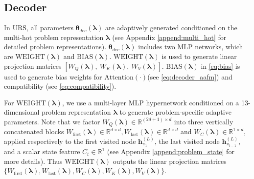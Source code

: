 \documentclass{article}
\theoremstyle{plain}
\theoremstyle{definition}
\theoremstyle{remark}
\begin{document}
\subsection{Decoder}
\label{append:decoder}
In URS, all parameters $\bm{\theta}_{dec}(\bm{\lambda})$ are adaptively generated conditioned on the multi-hot problem representation $\bm{\lambda}$ (see Appendix \ref{append:multi_hot} for detailed problem representations). $\bm{\theta}_{dec}(\bm{\lambda})$ includes two MLP networks, which are $\mathrm{WEIGHT}(\bm{\lambda})$ and $\mathrm{BIAS}(\bm{\lambda})$. $\mathrm{WEIGHT}(\bm{\lambda})$ is used to generate linear projection matrices $[W_{Q}(\bm{\lambda}),\ W_{K}(\bm{\lambda}),\ W_{V}(\bm{\lambda})]$. $\mathrm{BIAS}(\bm{\lambda})$ in \cref{eq:bias} is used to generate bias weights for $\mathrm{Attention}(\cdot)$(see \cref{eq:decoder_aafm}) and compatibility (see \cref{eq:compatibility}).

For $\mathrm{WEIGHT}(\bm{\lambda})$, we use a multi-layer MLP hypernetwork conditioned on a 13-dimensional problem representation $\bm{\lambda}$ to generate problem-specific adaptive parameters. Note that we factor $W_{Q}(\bm{\lambda}) \in \mathbb{R}^{(2d+1)\times d}$ into three vertically concatenated blocks $W_{\text{first}}(\bm{\lambda})\in \mathbb{R}^{d\times d}, W_{\text{last}}(\bm{\lambda}) \in \mathbb{R}^{d\times d}$ and $W_{C}(\bm{\lambda}) \in \mathbb{R}^{1\times d}$, applied respectively to the first visited node $\mathbf{h}_{\pi_1}^{(L)}$, the last visited node $\mathbf{h}_{\pi_{t-1}}^{(L)}$, and a scalar state feature $C_t \in \mathbb{R}^{1}$ (see Appendix \ref{append:problem_state} for more details). Thus $\mathrm{WEIGHT}(\bm{\lambda})$ outputs the linear projection matrices $\{W_{\text{first}}(\bm{\lambda}), W_{\text{last}}(\bm{\lambda}), W_{C}(\bm{\lambda}), W_{K}(\bm{\lambda}), W_{V}(\bm{\lambda})\}$. 
\end{document}
